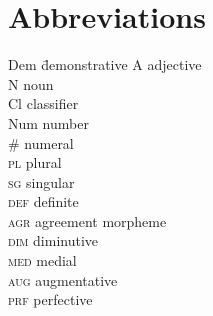 \documentclass[output=paper
,modfonts
,nonflat]{langsci/langscibook}
\begin{document}
\section*{Abbreviations}
\begin{multicols}{2}
	\begin{tabbing}
		Dem\hspace{1em} \= demonstrative \kill
		A \> adjective \\
		N \> noun \\
		Cl \> classifier \\
		Num \> number \\
		\# \> numeral \\
		\textsc{pl} \> plural \\
		\textsc{sg} \> singular \\
		\textsc{def} \> definite \\
		\textsc{agr} \> agreement morpheme \\
		\textsc{dim} \> diminutive \\
		\textsc{med} \> medial \\
		\textsc{aug} \> augmentative \\
		\textsc{prf} \> perfective \\
	\end{tabbing}
\end{multicols}

{\sloppy
\printbibliography[heading=subbibliography,notkeyword=this]
}
\end{document}
